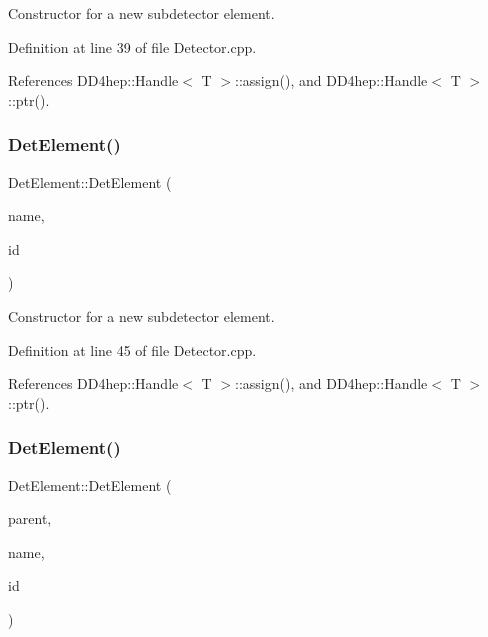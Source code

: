 Constructor for a new subdetector element. 



Definition at line 39 of file Detector.\+cpp.



References D\+D4hep\+::\+Handle$<$ T $>$\+::assign(), and D\+D4hep\+::\+Handle$<$ T $>$\+::ptr().

\hypertarget{class_d_d4hep_1_1_geometry_1_1_det_element_adc0c4bb734693dc5945ed9649c4f0f9f}{}\label{class_d_d4hep_1_1_geometry_1_1_det_element_adc0c4bb734693dc5945ed9649c4f0f9f} 
\subsubsection{\texorpdfstring{Det\+Element()}{DetElement()}\hspace{0.1cm}{\footnotesize\ttfamily [7/8]}}
{\footnotesize\ttfamily Det\+Element\+::\+Det\+Element (\begin{DoxyParamCaption}\item[{const std\+::string \&}]{name,  }\item[{int}]{id }\end{DoxyParamCaption})}



Constructor for a new subdetector element. 



Definition at line 45 of file Detector.\+cpp.



References D\+D4hep\+::\+Handle$<$ T $>$\+::assign(), and D\+D4hep\+::\+Handle$<$ T $>$\+::ptr().

\hypertarget{class_d_d4hep_1_1_geometry_1_1_det_element_a63af6313ed873b0596250e0a27de93d1}{}\label{class_d_d4hep_1_1_geometry_1_1_det_element_a63af6313ed873b0596250e0a27de93d1} 
\subsubsection{\texorpdfstring{Det\+Element()}{DetElement()}\hspace{0.1cm}{\footnotesize\ttfamily [8/8]}}
{\footnotesize\ttfamily Det\+Element\+::\+Det\+Element (\begin{DoxyParamCaption}\item[{\hyperlink{class_d_d4hep_1_1_geometry_1_1_det_element}{Det\+Element}}]{parent,  }\item[{const std\+::string \&}]{name,  }\item[{int}]{id }\end{DoxyParamCaption})}



